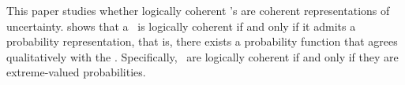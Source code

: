 This paper studies whether logically coherent \summ's are coherent representations of uncertainty. 
 shows that a \summ \ is
logically coherent if and only if
it admits a probability representation, 
that is, there exists a probability function that
agrees qualitatively with the \summ.
Specifically, \stdsumms \ are 
logically coherent if and only if
they are extreme-valued probabilities.

